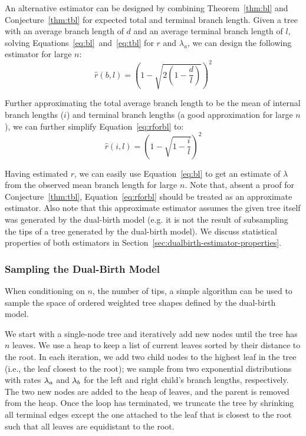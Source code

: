 An alternative estimator can be designed by combining Theorem~\ref{thm:bl} and Conjecture~\ref{thm:tbl} for expected total and terminal branch length. Given a tree with an average branch length of $d$ and an average terminal branch length of $l$, solving Equations~\ref{eq:bl}~and~\ref{eq:tbl} for $r$ and $\lambda_a$, we can design the following estimator for large $n$:
\begin{equation}\label{eq:rforbl}
\hat{r}(b,l) = \left(1-\sqrt{2\left(1-\frac{d}{l}\right)}\right)^2
\end{equation}

Further approximating the total average branch length to be the mean of internal branch lengths ($i$) and terminal branch lengths (a good approximation for large $n$), we can further simplify Equation~\ref{eq:rforbl} to:
\begin{equation}\label{eq:rforbl-approx}
\hat{r}(i,l) = \left(1-\sqrt{1-\frac{i}{l}}\right)^2
\end{equation}

Having estimated $r$, we can easily use Equation~\ref{eq:bl} to get an estimate of $\lambda$ from the observed mean branch length for large $n$. Note that, absent a proof for Conjecture~\ref{thm:tbl}, Equation~\ref{eq:rforbl} should be treated as an approximate estimator. Also note that this approximate estimator assumes the given tree itself was generated by the dual-birth model (e.g. it is not the result of subsampling the tips of a tree generated by the dual-birth model). We discuss statistical properties of both estimators in Section~\ref{sec:dualbirth-estimator-properties}.

\subsubsection{Sampling the Dual-Birth Model}\label{sec:samplingalgo}\label{sec:db-algo}
When conditioning on $n$, the number of tips, a simple algorithm can be used to sample the space of ordered weighted tree shapes defined by the dual-birth model.

We start with a single-node tree and iteratively add new nodes until the tree has $n$ leaves. We use a heap to keep a list of current leaves sorted by their distance to the root. In each iteration, we add two child nodes to the highest leaf in the tree (i.e., the leaf closest to the root); we sample from two exponential distributions with rates $\lambda_a$ and $\lambda_b$ for the left and right child's branch lengths, respectively. The two new nodes are added to the heap of leaves, and the parent is removed from the heap. Once the loop has terminated, we truncate the tree by shrinking all terminal edges except the one attached to the leaf that is closest to the root such that all leaves are equidistant to the root.

